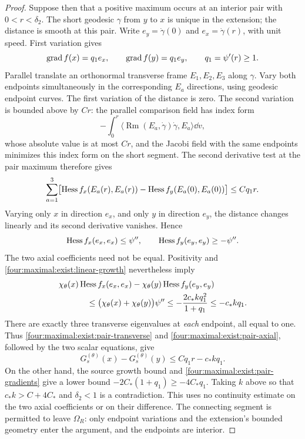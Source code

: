 \begin{proof}
Suppose then that a positive maximum occurs at an interior pair with
$0<r<\delta_2$.  The short geodesic $\gamma$ from $y$ to $x$ is unique
in the extension; the distance is smooth at this pair.  Write
$e_y=\dot\gamma(0)$ and $e_x=\dot\gamma(r)$, with unit speed.  First
variation gives
\begin{equation}\label{four:maximal:exist:pair-gradients}
 \operatorname{grad} f(x)=q_1e_x,\qquad \operatorname{grad} f(y)=q_1e_y,
       \qquad q_1=\psi'(r)\ge1.
\end{equation}
Parallel translate an orthonormal transverse frame $E_1,E_2,E_3$
along $\gamma$.  Vary both endpoints simultaneously in the corresponding
$E_a$ directions, using geodesic endpoint curves.  The first variation
of the distance is zero.  The second variation is bounded above by
$Cr$: the parallel comparison field has index form
\[
 -\int_0^r
 \bigl\langle\operatorname{Rm}(E_a,\dot\gamma)\dot\gamma,E_a
 \bigr\rangle\dd v,
\]
whose absolute value is at most $Cr$, and the Jacobi field with the
same endpoints minimizes this index form on the short segment.
The second derivative test at the pair maximum therefore gives
\begin{equation}\label{four:maximal:exist:pair-transverse}
 \sum_{a=1}^3\bigl[
  \operatorname{Hess} f_x(E_a(r),E_a(r))-
  \operatorname{Hess} f_y(E_a(0),E_a(0))\bigr]\le Cq_1r.
\end{equation}
Varying only $x$ in direction $e_x$, and only $y$ in direction $e_y$,
the distance changes linearly and its second derivative vanishes.
Hence
\[
 \operatorname{Hess} f_x(e_x,e_x)\le\psi'',\qquad
 \operatorname{Hess} f_y(e_y,e_y)\ge-\psi''.
\]
The two axial coefficients need not be equal.  Positivity and
\eqref{four:maximal:exist:linear-growth} nevertheless imply
\begin{equation}\label{four:maximal:exist:pair-axial}
 \begin{split}
 &\chi_\theta(x)\Hess f_x(e_x,e_x)
        -\chi_\theta(y)\Hess f_y(e_y,e_y)\\
 &\hspace{12mm}\le
    \bigl(\chi_\theta(x)+\chi_\theta(y)\bigr)\psi''
    \le-\frac{2c_*kq_1^2}{1+q_1}\le-c_*kq_1.
 \end{split}
\end{equation}
There are exactly three transverse eigenvalues at \emph{each} endpoint,
all equal to one.  Thus \eqref{four:maximal:exist:pair-transverse} and
\eqref{four:maximal:exist:pair-axial}, followed by the two scalar equations, give
\[
 G_s^{(\theta)}(x)-G_s^{(\theta)}(y)
       \le Cq_1r-c_*kq_1.
\]
On the other hand, the source growth bound and
\eqref{four:maximal:exist:pair-gradients} give a lower bound
$-2C_*(1+q_1)\ge-4C_*q_1$.  Taking $k$ above so that
$c_*k>C+4C_*$ and $\delta_2<1$ is a contradiction.
This uses no continuity estimate on the two axial coefficients or on
their difference.  The connecting segment is permitted to leave
$\Omega_R$: only endpoint variations and the extension's bounded
geometry enter the argument, and the endpoints are interior.


\end{proof}
